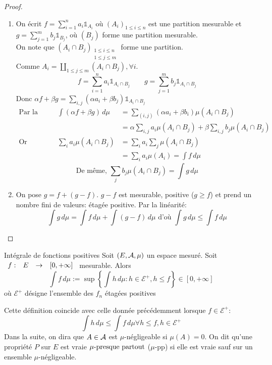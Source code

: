 \documentclass[]{report}
\begin{document}
    \begin{proof}{}{}
        \begin{enumerate}
            \item On écrit $f=\sum_{i=1}^{n}a_i\mathbb{1}_{A_i}$ où $(A_i)_{1\le i\le n}$ est une partition mesurable et $g=\sum_{j=1}^{m} b_j\mathbb{1}_{B_j}$, où $(B_j)$ forme une partition mesurable.\\
            On note que $(A_i\cap B_j)_{\substack{1\le i\le n\\1\le j\le m}}$ forme une partition.\\
            Comme $A_i=\amalg_{1\le j\le m}(A_i\cap B_j),\forall i$.
            \[f=\sum_{i=1}^{n}a_i\mathbb{1}_{A_i\cap B_j}\qquad g=\sum_{j=1}^{m} b_j\mathbb{1}_{A_i\cap B_j}\]
            Donc $\alpha f+\beta g=\sum_{i,j}(\alpha a_i+\beta b_j)\mathbb{1}_{A_i\cap B_j}$\\
            \begin{align*}\text{Par la remarque précédente (3)}&\int (\alpha f+\beta g)\,d\mu&=\sum_{(i,j)}(\alpha a_i+\beta b_i)\mu(A_i\cap B_j)\\
                &&=\alpha\sum_{i,j}a_i\mu(A_i\cap B_j)+\beta\sum_{i,j} b_j\mu(A_i\cap B_j)\\
                \text{Or }&\sum_{i}a_i\mu(A_i\cap B_j)&=\sum_{i}a_i\sum_j\mu(A_i\cap B_j)\\
                &&=\sum_i a_i\mu(A_i)=\int f\,d\mu
            \end{align*}
            \[\text{De même, }\sum_j b_j \mu(A_i\cap B_j)=\int g\,d\mu\]
            \item On pose $g=f+ (g-f)$. $g-f$ est mesurable, positive ($g\ge f$) et prend un nombre fini de valeurs: étagée positive. Par la linéarité:
            \[\int g\,d\mu=\int f\,d\mu+\int (g-f)\,d\mu\text{ d'où }\int g\,d\mu\le \int f\,d\mu\]
        \end{enumerate}
    \end{proof}

    \begin{df}{Intégrale de fonctions positives}{}
        Soit $(E,\mathcal{A},\mu)$ un espace mesuré. Soit $\begin{array}{ccccc} f : & E & \to & [0,+\infty] \end{array}$ mesurable. Alors 
        \[\int f\,d\mu:=\sup\left\{\int h\,d\mu:h\in \mathcal{E}^+,h\le f\right\}\in [0,+\infty] \]
        où $\mathcal{E}^+$ désigne l'ensemble des $f_n$ étagées positives
    \end{df}

    \begin{re}{}{}
        Cette définition coincide avec celle donnée précédemment lorsque $f\in\mathcal{E}^+$:
        \[\int h\,d\mu\le\int f\,d\mu\forall h\le f,h\in\mathcal{E}^+\]
        Dans la suite, on dira que $A\in\mathcal{A}$ est $\mu$-négligeable si $\mu(A)=0$. On dit qu'une propriété $P$ sur $E$ est vraie $\mu\text{-presque partout}$ ($\mu$-pp) si elle est vraie sauf sur un ensemble $\mu$-négligeable.
    \end{re}
\end{document}
